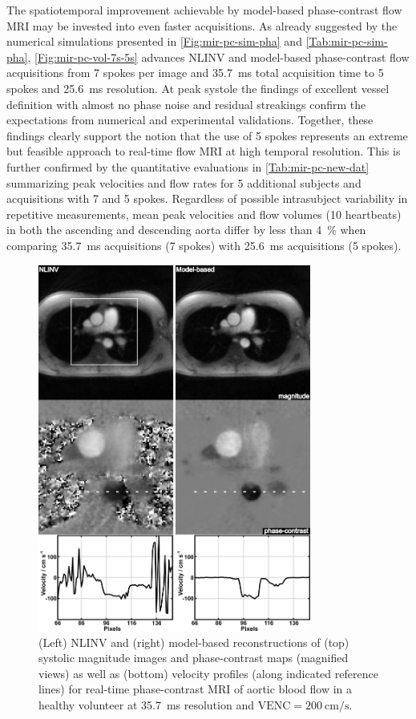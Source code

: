 The spatiotemporal improvement achievable by model-based phase-contrast flow MRI may be invested into even faster acquisitions. As already suggested by the numerical simulations presented in \cref{Fig:mir-pc-sim-pha} and \cref{Tab:mir-pc-sim-pha}, \cref{Fig:mir-pc-vol-7s-5s} advances NLINV and model-based phase-contrast flow acquisitions from \num{7} spokes per image and \SI{35.7}{\ms} total acquisition time to \num{5} spokes and \SI{25.6}{\ms} resolution. At peak systole the findings of excellent vessel definition with almost no phase noise and residual streakings confirm the expectations from numerical and experimental validations. Together, these findings clearly support the notion that the use of \num{5} spokes represents an extreme but feasible approach to real-time flow MRI at high temporal resolution. This is further confirmed by the quantitative evaluations in \cref{Tab:mir-pc-new-dat} summarizing peak velocities and flow rates for \num{5} additional subjects and acquisitions with \num{7} and \num{5} spokes. Regardless of possible intrasubject variability in repetitive measurements, mean peak velocities and flow volumes (10 heartbeats) in both the ascending and descending aorta differ by less than \SI{4}{\percent} when comparing \SI{35.7}{\ms} acquisitions (\num{7} spokes) with \SI{25.6}{\ms} acquisitions (\num{5} spokes).
\vspace{10mm}

\begin{figure}[h!]
  \centering
  \includegraphics[width=0.8\textwidth]{fig/mir-pc-vol-7s.png}
  \caption{(Left) NLINV and (right) model-based reconstructions of (top) systolic magnitude images and phase-contrast maps (magnified views) as well as (bottom) velocity profiles (along indicated reference lines) for real-time phase-contrast MRI of aortic blood flow in a healthy volunteer at \SI{35.7}{\ms} resolution and $\text{VENC} = \SI{200}{\cm\per\second}$.} \label{Fig:mir-pc-vol-7s}
\end{figure}

